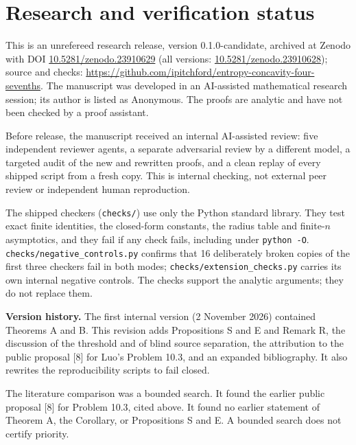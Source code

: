 \documentclass[
  british,
  10pt,
]{article}
\begin{document}
\section{Research and verification
status}\label{research-and-verification-status}

This is an unrefereed research release, version 0.1.0-candidate,
archived at Zenodo with DOI
\href{https://doi.org/10.5281/zenodo.23910629}{10.5281/zenodo.23910629}
(all versions:
\href{https://doi.org/10.5281/zenodo.23910628}{10.5281/zenodo.23910628});
source and checks:
\url{https://github.com/ipitchford/entropy-concavity-four-sevenths}. The
manuscript was developed in an AI-assisted mathematical research
session; its author is listed as Anonymous. The proofs are analytic and
have not been checked by a proof assistant.

Before release, the manuscript received an internal AI-assisted review:
five independent reviewer agents, a separate adversarial review by a
different model, a targeted audit of the new and rewritten proofs, and a
clean replay of every shipped script from a fresh copy. This is internal
checking, not external peer review or independent human reproduction.

The shipped checkers (\texttt{checks/}) use only the Python standard
library. They test exact finite identities, the closed-form constants,
the radius table and finite-\(n\) asymptotics, and they fail if any
check fails, including under \texttt{python\ -O}.
\texttt{checks/negative\_controls.py} confirms that 16 deliberately
broken copies of the first three checkers fail in both modes;
\texttt{checks/extension\_checks.py} carries its own internal negative
controls. The checks support the analytic arguments; they do not replace
them.

\textbf{Version history.} The first internal version (2 November 2026)
contained Theorems A and B. This revision adds Propositions S and E and
Remark R, the discussion of the threshold and of blind source
separation, the attribution to the public proposal {[}8{]} for Luo's
Problem 10.3, and an expanded bibliography. It also rewrites the
reproducibility scripts to fail closed.

The literature comparison was a bounded search. It found the earlier
public proposal {[}8{]} for Problem 10.3, cited above. It found no
earlier statement of Theorem A, the Corollary, or Propositions S and E.
A bounded search does not certify priority.
\end{document}
